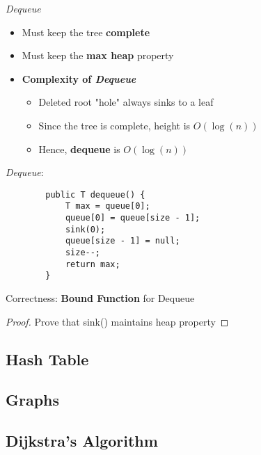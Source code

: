 \documentclass[10pt, 
a4paper, 
oneside, 
headinclude, footinclude, 
BCOR5mm]
{scrartcl}
\begin{document}
\begin{definition}
    \textit{Dequeue}
    \begin{itemize}
        \item Must keep the tree \textbf{complete}
        \item Must keep the \textbf{max heap} property 
        \item \textbf{Complexity of \textit{Dequeue}}
        \begin{itemize}
            \item Deleted root "hole" always sinks to a leaf
            \item Since the tree is complete, height is $O(\log(n))$
            \item Hence, \textbf{dequeue} is $O(\log(n))$
        \end{itemize}
    \end{itemize}
    \textit{Dequeue}:
    \begin{lstlisting}
        public T dequeue() {
            T max = queue[0];
            queue[0] = queue[size - 1];
            sink(0);
            queue[size - 1] = null;
            size--;
            return max;
        }
    \end{lstlisting}
    Correctness: \textbf{Bound Function} for Dequeue
    \begin{proof}
        Prove that sink() maintains heap property
    \end{proof}
\end{definition}

\newpage
\subsection{Hash Table}

\newpage
\subsection{Graphs}


\newpage
\subsection{Dijkstra's Algorithm}
\end{document}
